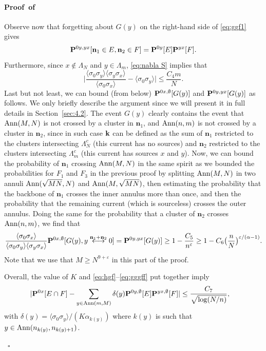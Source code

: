 \documentclass[a4paper,oneside,11pt]{article}
\numberwithin{equation}{section}
\numberwithin{equation}{section}
\numberwithin{equation}{section}
\newenvironment{proof}[1][\relax]%
  {\paragraph{Proof\ifx#1\relax\else~of #1\fi}}%
  {~\hfill$\square$\par\bigskip}
\newcommand{\ep}{\varepsilon}
\newcommand{\n}{\mathbf{n}}
\begin{document}
\begin{proof}
Observe now that forgetting about $G(y)$ on the right-hand side of \eqref{eq:ggf1} gives 
\begin{equation}{\bf P}^{0y,yx}[\n_1\in E,\n_2\in F]={\bf P}^{0y}[E]{\bf P}^{yx}[F].\end{equation}
Furthermore, since $x\notin \Lambda_N$ and $y\in\Lambda_{m}$, \eqref{eq:nabla S} implies that 
\begin{equation}
\Big|\frac{\langle\sigma_0\sigma_y\rangle\langle\sigma_y\sigma_x\rangle}{\langle\sigma_0\sigma_x\rangle}-\langle\sigma_0\sigma_y\rangle\Big|\le \frac{C_4m}{N}.
\end{equation} 
Last but not least, we can bound (from below) ${\bf P}^{0x,\emptyset}[G(y)]$ and ${\bf P}^{0y,yx}[G(y)]$ as follows. We only briefly describe the argument since we will present it in full details in Section~\ref{sec:4.2}. The event $G(y)$ clearly contains the event that ${\rm Ann}(M,N)$ is not crossed by a cluster in $\n_1$, and ${\rm Ann}(n,m)$ is not crossed by a cluster in $\n_2$, since in such case ${\bf k}$ can be defined as the sum of $\n_1$ restricted to the clusters intersecting $\Lambda_N^c$ (this current has no sources) and $\n_2$ restricted to the clusters intersecting $\Lambda_m^c$ (this current has sources $x$ and $y$).
Now, we can bound the probability of $\n_1$ crossing ${\rm Ann}(M,N)$ in the same spirit as  we bounded the probabilities for $F_1$ and $F_3$ in the previous proof by splitting ${\rm Ann}(M,N)$ in two annuli ${\rm Ann}(\sqrt{MN},N)$ and ${\rm Ann}(M,\sqrt{MN})$, then estimating the probability that the backbone of $\n_1$ crosses the inner annulus more than once, and then  the probability that the remaining current (which is sourceless) crosses the outer annulus. Doing the same for the probability that a cluster of $\n_2$ crosses ${\rm Ann}(n,m)$, we find that
\begin{equation}
\label{eq:gggff}\frac{\langle\sigma_0\sigma_x\rangle}{\langle\sigma_0\sigma_y\rangle\langle\sigma_y\sigma_x\rangle}{\bf P}^{0x,\emptyset}[G(y),y\stackrel{\n_1+\n_2}{\longleftrightarrow}0]={\bf P}^{0y,yx}[G(y)]\ge 1-\frac{C_5}{n^\ep}\ge 1-C_6\big(\frac nN\big)^{\ep/(\alpha-1)}.
\end{equation}
Note that we use that $M\ge N^{9+\ep}$ in this part of the proof. 

 Overall, the value of $K$ and \eqref{eq:hgf}--\eqref{eq:gggff} put together imply
\begin{align}\label{eq:gf simple}|{\bf P}^{0x}[E\cap F]-\sum_{y\in {\rm Ann}(m,M)}\delta(y){\bf P}^{0y,\emptyset}[E]{\bf P}^{yx,\emptyset}[F]|&
\le \frac{C_7}{\sqrt{\log(N/n)}},
\end{align}
with $\delta(y)=\langle\sigma_0\sigma_y\rangle/(K\alpha_{k(y)})$ where $k(y)$ is such that $y\in{\rm Ann}(n_{k(y)},n_{k(y)+1})$.


\end{proof}
\end{document}

